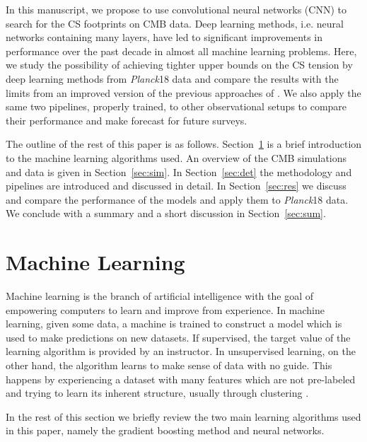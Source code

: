 \documentclass[fleqn,usenatbib]{mnras}
\begin{document}
In this manuscript, we propose to use convolutional neural networks (CNN) to search for the CS footprints on CMB data. 
Deep learning methods, i.e. neural networks containing many layers, have led to significant improvements in performance over the past decade in almost all machine learning problems. 
%
Here, we study the possibility of achieving tighter upper bounds on the CS tension by deep learning methods from {\it Planck}18 data  and compare the results with the limits from an improved version of the previous approaches of \cite{vaf17,vaf18}.
%
%
We also apply the same two pipelines, properly trained, to other observational setups to compare their performance and make forecast for future surveys. 

The outline of the rest of this paper is as follows. 
Section~\ref{sec:ml} is a brief introduction to the machine learning algorithms used. An overview of the CMB simulations and data  is given in Section~\ref{sec:sim}. In Section~\ref{sec:det} the methodology and pipelines are introduced and discussed in detail. In Section~\ref{sec:res} we discuss and compare the performance of the models and apply them to {\it Planck}18 data. We conclude with a summary and a short discussion in Section~\ref{sec:sum}.

\section{Machine Learning}\label{sec:ml}%

Machine learning is the branch of artificial intelligence with the goal of empowering computers to learn and improve from experience. 
%
In machine learning, given some data, a machine is trained to construct a model which is used to make predictions on new datasets. 
%
If supervised, the target value of the learning algorithm is provided by an instructor. In unsupervised learning, on the other hand, the algorithm learns to make sense of  data with no guide. This happens by experiencing a dataset with many features which are not pre-labeled and trying to learn its inherent structure, usually through clustering \citep{goodfellow2016deep}. 


In the rest of this section we briefly review the two main learning algorithms used in this paper, namely the gradient boosting method and neural networks.
\end{document}
